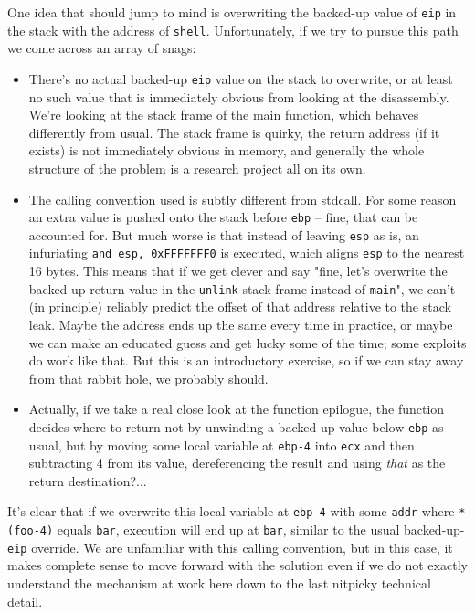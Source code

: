 \documentclass{article}
\newcommand{\xcode}[2]{\colorbox{ubuntuback}{\lstinline[language=#1]|#2|}}
\newcommand{\asm}[1]{\xcode{{[x86masm]assembler}}{#1}}
\begin{document}
One idea that should jump to mind is overwriting the backed-up value of \asm{eip} in the stack with the address of \xcode{bash}{shell}. Unfortunately, if we try to pursue this path we come across an array of snags: 

\begin{itemize}
    \item There's no actual backed-up \asm{eip} value on the stack to overwrite, or at least no such value that is immediately obvious from looking at the disassembly. We're looking at the stack frame of the main function, which behaves differently from usual. The stack frame is quirky, the return address (if it exists) is not immediately obvious in memory, and generally the whole structure of the problem is a research project all on its own.

    \item The calling convention used is subtly different from stdcall. For some reason an extra value is pushed onto the stack before \asm{ebp} -- fine, that can be accounted for. But much worse is that instead of leaving \asm{esp} as is, an infuriating \asm{and esp, 0xFFFFFFF0} is executed, which aligns \asm{esp} to the nearest 16 bytes. This means that if we get clever and say "fine, let's overwrite the backed-up return value in the \xcode{C}{unlink} stack frame instead of \xcode{C}{main}", we can't (in principle) reliably predict the offset of that address relative to the stack leak. Maybe the address ends up the same every time in practice, or maybe we can make an educated guess and get lucky some of the time; some exploits do work like that. But this is an introductory exercise, so if we can stay away from that rabbit hole, we probably should.

    \item Actually, if we take a real close look at the function epilogue, the function decides where to return not by unwinding a backed-up value below \asm{ebp} as usual, but by moving some local variable at \asm{ebp-4} into \asm{ecx} and then subtracting 4 from its value, dereferencing the result and using \textit{that} as the return destination?... 
\end{itemize}

It's clear that if we overwrite this local variable at \asm{ebp-4} with some \asm{addr} where \asm{*(foo-4)} equals \asm{bar}, execution will end up at \asm{bar}, similar to the usual backed-up-\asm{eip} override. We are unfamiliar with this calling convention, but in this case, it makes complete sense to move forward with the solution even if we do not exactly understand the mechanism at work here down to the last nitpicky technical detail.
\end{document}
